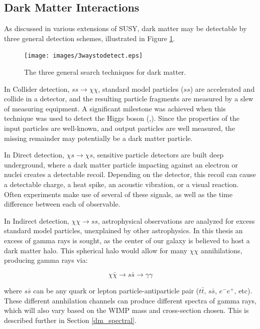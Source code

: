  \subsection{Dark Matter Interactions}
    As discussed in various extensions of SUSY, dark matter may be detectable by three general detection schemes, illustrated in Figure \ref{fig:3_searches}.

    \begin{figure}[ht]
      \centering
      \texttt{[image: images/3waystodetect.eps]}
      \caption[3 Search Techniques]{
        The three general search techniques for dark matter.}
      \label{fig:3_searches}
    \end{figure}

    In Collider detection, $ss \rightarrow \chi\chi$, standard model particles ($ss$) are accelerated and collide in a detector, and the resulting particle fragments are measured by a slew of measuring equipment.
    A significant milestone was achieved when this technique was used to detect the Higgs boson (\cite{Higgs_ATLAS},\cite{Higgs_CMS}).
    Since the properties of the input particles are well-known, and output particles are well measured, the missing remainder may potentially be a dark matter particle.

    In Direct detection, $\chi s \rightarrow \chi s$, sensitive particle detectors are built deep underground, where a dark matter particle impacting against an electron or nuclei creates a detectable recoil.
    Depending on the detector, this recoil can cause a detectable charge, a heat spike, an acoustic vibration, or a visual reaction.
    Often experiments make use of several of these signals, as well as the time difference between each of observable.

    In Indirect detection, $\chi\chi \rightarrow ss$, astrophysical observations are analyzed for excess standard model particles, unexplained by other astrophysics.
    In this thesis an excess of gamma rays is sought, as the center of our galaxy is believed to host a dark matter halo.
    This spherical halo would allow for many $\chi\chi$ annihilations, producing gamma rays via: 

    $$\chi\bar{\chi} \rightarrow s\bar{s} \rightarrow \gamma\gamma$$

    where $s\bar{s}$ can be any quark or lepton particle-antiparticle pair ($t\bar{t}$, $s\bar{s}$, $e^{-}e^{+}$, etc).
    These different annhilation channels can produce different spectra of gamma rays, which will also vary based on the WIMP mass and cross-section chosen.
    This is described further in Section \ref{dm_spectral}.


